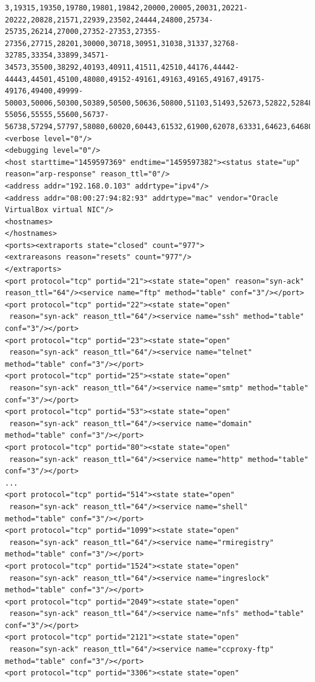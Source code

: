 \documentclass[10pt,a4paper]{report}
\begin{document}
\begin{verbatim}
3,19315,19350,19780,19801,19842,20000,20005,20031,20221-20222,20828,21571,22939,23502,24444,24800,25734-25735,26214,27000,27352-27353,27355-27356,27715,28201,30000,30718,30951,31038,31337,32768-32785,33354,33899,34571-34573,35500,38292,40193,40911,41511,42510,44176,44442-44443,44501,45100,48080,49152-49161,49163,49165,49167,49175-49176,49400,49999-50003,50006,50300,50389,50500,50636,50800,51103,51493,52673,52822,52848,52869,54045,54328,55055-55056,55555,55600,56737-56738,57294,57797,58080,60020,60443,61532,61900,62078,63331,64623,64680,65000,65129,65389"/>
<verbose level="0"/>
<debugging level="0"/>
<host starttime="1459597369" endtime="1459597382"><status state="up" reason="arp-response" reason_ttl="0"/>
<address addr="192.168.0.103" addrtype="ipv4"/>
<address addr="08:00:27:94:82:93" addrtype="mac" vendor="Oracle VirtualBox virtual NIC"/>
<hostnames>
</hostnames>
<ports><extraports state="closed" count="977">
<extrareasons reason="resets" count="977"/>
</extraports>
<port protocol="tcp" portid="21"><state state="open" reason="syn-ack" 
reason_ttl="64"/><service name="ftp" method="table" conf="3"/></port>
<port protocol="tcp" portid="22"><state state="open"
 reason="syn-ack" reason_ttl="64"/><service name="ssh" method="table" conf="3"/></port>
<port protocol="tcp" portid="23"><state state="open"
 reason="syn-ack" reason_ttl="64"/><service name="telnet" method="table" conf="3"/></port>
<port protocol="tcp" portid="25"><state state="open"
 reason="syn-ack" reason_ttl="64"/><service name="smtp" method="table" conf="3"/></port>
<port protocol="tcp" portid="53"><state state="open"
 reason="syn-ack" reason_ttl="64"/><service name="domain" method="table" conf="3"/></port>
<port protocol="tcp" portid="80"><state state="open"
 reason="syn-ack" reason_ttl="64"/><service name="http" method="table" conf="3"/></port>
...
<port protocol="tcp" portid="514"><state state="open"
 reason="syn-ack" reason_ttl="64"/><service name="shell" method="table" conf="3"/></port>
<port protocol="tcp" portid="1099"><state state="open"
 reason="syn-ack" reason_ttl="64"/><service name="rmiregistry" method="table" conf="3"/></port>
<port protocol="tcp" portid="1524"><state state="open"
 reason="syn-ack" reason_ttl="64"/><service name="ingreslock" method="table" conf="3"/></port>
<port protocol="tcp" portid="2049"><state state="open"
 reason="syn-ack" reason_ttl="64"/><service name="nfs" method="table" conf="3"/></port>
<port protocol="tcp" portid="2121"><state state="open"
 reason="syn-ack" reason_ttl="64"/><service name="ccproxy-ftp" method="table" conf="3"/></port>
<port protocol="tcp" portid="3306"><state state="open"

\end{verbatim}
\end{document}
